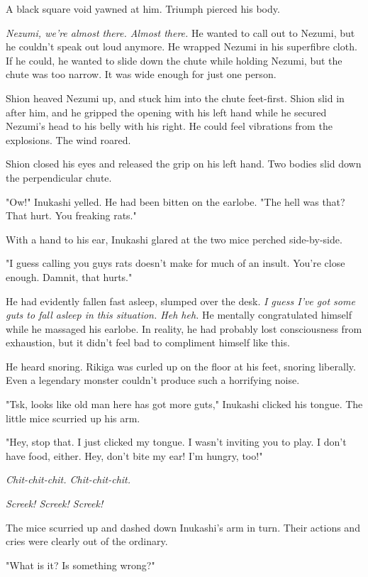 A black square void yawned at him. Triumph pierced his body.

\emph{Nezumi, we're almost there. Almost there.} He wanted to call out to
Nezumi, but he couldn't speak out loud anymore. He wrapped Nezumi in his
superfibre cloth. If he could, he wanted to slide down the chute while
holding Nezumi, but the chute was too narrow. It was wide enough for
just one person.

Shion heaved Nezumi up, and stuck him into the chute feet-first. Shion
slid in after him, and he gripped the opening with his left hand while
he secured Nezumi's head to his belly with his right. He could feel
vibrations from the explosions. The wind roared.

Shion closed his eyes and released the grip on his left hand. Two bodies
slid down the perpendicular chute.

\mybreak

"Ow!" Inukashi yelled. He had been bitten on the earlobe. "The hell was
that? That hurt. You freaking rats."

With a hand to his ear, Inukashi glared at the two mice perched
side-by-side.

"I guess calling you guys rats doesn't make for much of an insult.
You're close enough. Damnit, that hurts."

He had evidently fallen fast asleep, slumped over the desk. \emph{I guess I've
got some guts to fall asleep in this situation. Heh heh.} He mentally
congratulated himself while he massaged his earlobe. In reality, he had
probably lost consciousness from exhaustion, but it didn't feel bad to
compliment himself like this.

He heard snoring. Rikiga was curled up on the floor at his feet, snoring
liberally. Even a legendary monster couldn't produce such a horrifying
noise.

"Tsk, looks like old man here has got more guts," Inukashi clicked his
tongue. The little mice scurried up his arm.

"Hey, stop that. I just clicked my tongue. I wasn't inviting you to
play. I don't have food, either. Hey, don't bite my ear! I'm hungry,
too!"

\emph{Chit-chit-chit. Chit-chit-chit.}

\emph{Screek! Screek! Screek!}

The mice scurried up and dashed down Inukashi's arm in turn. Their
actions and cries were clearly out of the ordinary.

"What is it? Is something wrong?"

